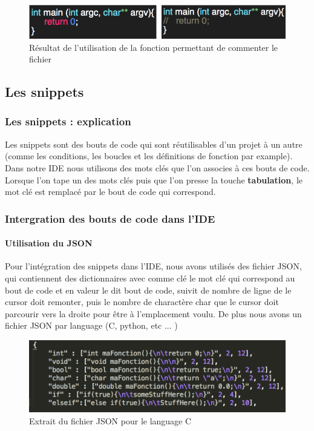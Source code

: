 \documentclass[a4paper,12pt]{article}
\begin{document}
	\begin{figure}[h!]
		\begin{center}
			\includegraphics[scale=0.8]{images/imgs_edit/resultat_commentaire}
			\caption{Résultat de l'utilisation de la fonction permettant de commenter le fichier}
		\end{center}
	\end{figure}
	
\subsection{Les snippets}
	
	\subsubsection{Les snippets : explication}

		Les snippets sont des bouts de code qui sont réutilisables d'un projet à un autre (comme les conditions, les boucles et les définitions de fonction par example). Dans notre IDE nous utilisons des mots clés que l'on associes à ces bouts de code. Lorsque l'on tape un des mots clés puis que l'on presse la touche \textbf{tabulation}, le mot clé est remplacé par le bout de code qui correspond.

	\subsubsection{Intergration des bouts de code dans l'IDE}

		\paragraph{Utilisation du JSON}

			Pour l'intégration des snippets dans l'IDE, nous avons utilisés des fichier JSON, qui contiennent des dictionnaires avec comme clé le mot clé qui correspond au bout de code et en valeur le dit bout de code, suivit de nombre de ligne de le cursor doit remonter, puis le nombre de charactère char que le cursor doit parcourir vers la droite pour être à l'emplacement voulu. De plus nous avons un fichier JSON par language (C, python, etc ... )

			\begin{figure}[h!]
				\begin{center}
					\includegraphics[scale=0.7]{images/exempleJSON}
					\caption{Extrait du fichier JSON pour le language C}
				\end{center}
			\end{figure}
\end{document}
